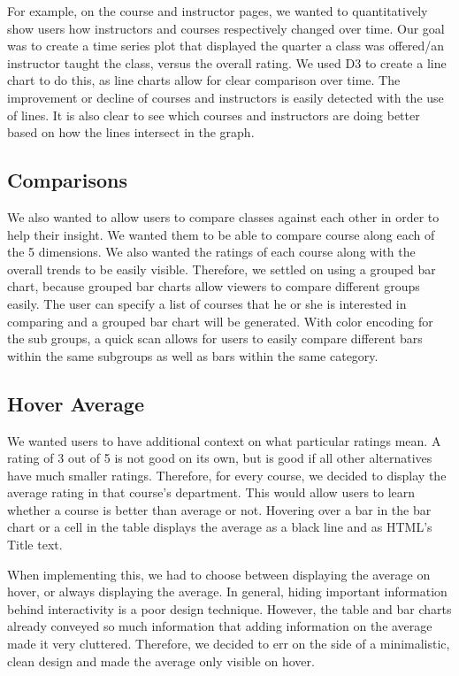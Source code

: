 \documentclass{chi2009}
\begin{document}
For example, on the course and instructor pages, we wanted to quantitatively show users how instructors and courses respectively changed over time. Our goal was to create a time series plot that displayed the quarter a class was offered/an instructor taught the class, versus the overall rating. We used D3 to create a line chart to do this, as line charts allow for clear comparison over time. The improvement or decline of courses and instructors is easily detected with the use of lines. It is also clear to see which courses and instructors are doing better based on how the lines intersect in the graph.

\subsection{Comparisons}
We also wanted to allow users to compare classes against each other in order to help their insight. We wanted them to be able to compare course along each of the 5 dimensions. We also wanted the ratings of each course along with the overall trends to be easily visible. Therefore, we settled on using a grouped bar chart, because grouped bar charts allow viewers to compare different groups easily. The user can specify a list of courses that he or she is interested in comparing and a grouped bar chart will be generated. With color encoding for the sub groups, a quick scan allows for users to easily compare different bars within the same subgroups as well as bars within the same category.

\subsection{Hover Average}
We wanted users to have additional context on what particular ratings mean. A rating of 3 out of 5 is not good on its own, but is good if all other alternatives have much smaller ratings. Therefore, for every course, we decided to display the average rating in that course's department. This would allow users to learn whether a course is better than average or not. Hovering over a bar in the bar chart or a cell in the table displays the average as a black line and as HTML's Title text.

When implementing this, we had to choose between displaying the average on hover, or always displaying the average. In general, hiding important information behind interactivity is a poor design technique. However, the table and bar charts already conveyed so much information that adding information on the average made it very cluttered. Therefore, we decided to err on the side of a minimalistic, clean design and made the average only visible on hover.
\end{document}

